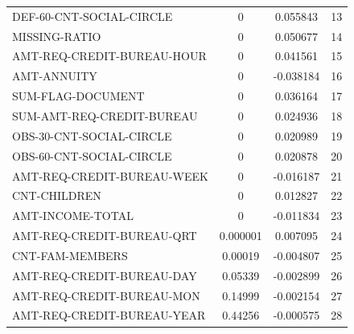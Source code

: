\begin{table} [h]
{\begin{tabular}{lccc}
    DEF-60-CNT-SOCIAL-CIRCLE   & 0        &  0.055843 & 13\\\rowcolor{bubbles}
    MISSING-RATIO              & 0        &  0.050677 & 14\\\rowcolor{mistyrose}
    AMT-REQ-CREDIT-BUREAU-HOUR & 0        &  0.041561 & 15\\\rowcolor{bubbles}
    AMT-ANNUITY                & 0        & -0.038184  & 16\\\rowcolor{mistyrose}
    SUM-FLAG-DOCUMENT          & 0        &  0.036164 & 17\\\rowcolor{bubbles}
    SUM-AMT-REQ-CREDIT-BUREAU  & 0        &  0.024936 & 18\\\rowcolor{mistyrose}
    OBS-30-CNT-SOCIAL-CIRCLE   & 0        &  0.020989 & 19\\\rowcolor{bubbles}
    OBS-60-CNT-SOCIAL-CIRCLE   & 0        &  0.020878 & 20\\\rowcolor{mistyrose}
    AMT-REQ-CREDIT-BUREAU-WEEK & 0        & -0.016187  & 21\\\rowcolor{bubbles}
    CNT-CHILDREN               & 0        &  0.012827 & 22\\\rowcolor{mistyrose}
    AMT-INCOME-TOTAL           & 0        & -0.011834 & 23\\\rowcolor{bubbles}
    AMT-REQ-CREDIT-BUREAU-QRT  & 0.000001 &  0.007095  & 24\\\rowcolor{mistyrose}
    CNT-FAM-MEMBERS            & 0.00019  & -0.004807 & 25\\\rowcolor{bubbles}
    AMT-REQ-CREDIT-BUREAU-DAY  & 0.05339  & -0.002899 & 26\\\rowcolor{mistyrose}
    AMT-REQ-CREDIT-BUREAU-MON  & 0.14999  & -0.002154 & 27\\\rowcolor{bubbles}
    AMT-REQ-CREDIT-BUREAU-YEAR & 0.44256  & -0.000575 & 28\\\hline
    \end{tabular}
    }
\end{table}

